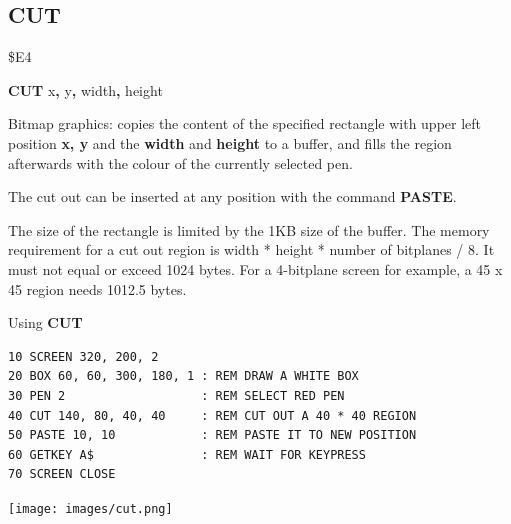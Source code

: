 
\newpage
\subsection{CUT}
\begin{description}[leftmargin=2cm,style=nextline]
\item [Token:]   \$E4

\item [Format:]  {\bf CUT} x{\bf,} y{\bf,} width{\bf,} height

\item [Usage:]   Bitmap graphics: copies the content of the specified rectangle with upper left position {\bf x, y} and the {\bf width} and {\bf height} to a buffer, and fills the region afterwards with the colour of the currently selected pen.

                 The cut out can be inserted at any position with the command {\bf PASTE}.

\item [Remarks:] The size of the rectangle is limited by the 1KB size of the buffer. The memory requirement for a cut out region is width * height * number of bitplanes / 8. It must not equal or exceed 1024 bytes. For a 4-bitplane screen for example, a 45 x 45 region needs 1012.5 bytes.

\item [Example:] Using {\bf CUT}

\begin{tcolorbox}[colback=black,coltext=white]
\verbatimfont{\codefont}
\begin{verbatim}
10 SCREEN 320, 200, 2
20 BOX 60, 60, 300, 180, 1 : REM DRAW A WHITE BOX
30 PEN 2                   : REM SELECT RED PEN
40 CUT 140, 80, 40, 40     : REM CUT OUT A 40 * 40 REGION
50 PASTE 10, 10            : REM PASTE IT TO NEW POSITION
60 GETKEY A$               : REM WAIT FOR KEYPRESS
70 SCREEN CLOSE
\end{verbatim}
\end{tcolorbox}

\item \begin{center}\texttt{[image: images/cut.png]}\end{center}
\end{description}


\newpage
